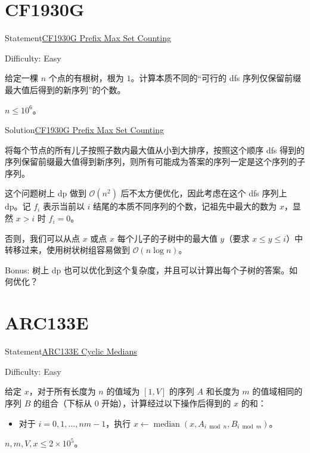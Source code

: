 \documentclass{beamer}
\begin{document}
    \section{CF1930G}

    \begin{frame}{Statement}{\href{https://codeforces.com/problemset/problem/1930/G}{CF1930G Prefix Max Set Counting}}

        Difficulty: Easy

        给定一棵 $n$ 个点的有根树，根为 $1$。计算本质不同的“可行的 dfs 序列仅保留前缀最大值后得到的新序列”的个数。
        
        $n \leq 10^{6}$。
		
	\end{frame}

    \begin{frame}{Solution}{\href{https://codeforces.com/problemset/problem/1930/G}{CF1930G Prefix Max Set Counting}}

        将每个节点的所有儿子按照子数内最大值从小到大排序，按照这个顺序 dfs 得到的序列保留前缀最大值得到新序列，则所有可能成为答案的序列一定是这个序列的子序列。

        \pause

        这个问题树上 dp 做到 $\mathcal{O}(n^2)$ 后不太方便优化，因此考虑在这个 dfs 序列上 dp。记 $f_{i}$ 表示当前以 $i$ 结尾的本质不同序列的个数，记祖先中最大的数为 $x$，显然 $x > i$ 时 $f_{i} = 0$。

        \pause

        否则，我们可以从点 $x$ 或点 $x$ 每个儿子的子树中的最大值 $y$（要求 $x \leq y \leq i$）中转移过来，使用树状树组容易做到 $\mathcal{O}(n \log n)$。

        \pause

        Bonus: 树上 dp 也可以优化到这个复杂度，并且可以计算出每个子树的答案。如何优化？
    
	\end{frame}

    \section{ARC133E}

    \begin{frame}{Statement}{\href{https://atcoder.jp/contests/arc133/tasks/arc133_e}{ARC133E Cyclic Medians}}

        Difficulty: Easy

        给定 $x$，对于所有长度为 $n$ 的值域为 $[1,V]$ 的序列 $A$ 和长度为 $m$ 的值域相同的序列 $B$ 的组合（下标从 $0$ 开始），计算经过以下操作后得到的 $x$ 的和：

        \begin{itemize}
            \item 对于 $i = 0,1,\dots,nm-1$，执行 $x \leftarrow \operatorname{median}(x,A_{i \bmod n},B_{i \bmod m})$。
        \end{itemize}

        $n,m,V,x \leq 2 \times 10^{5}$。
		
	\end{frame}
\end{document}
